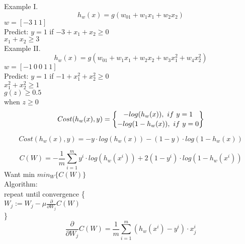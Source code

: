 \documentclass[12pt]{article}
\newcommand\tab[1][1cm]{\hspace*{#1}}
\newcommand*{\bfrac}[2]{\genfrac{\lbrace}{\rbrace}{0pt}{}{#1}{#2}}
\begin{document}
Example I.
\begin{equation}
h_w(x)=g(w_01+w_1x_1+w_2x_2)
\end{equation}
$w=[-3\ 1\ 1]$\\
Predict: $y=1$ if $-3+x_1+x_2\geq0$\\
$x_1+x_2\geq3$\\

\newpage
Example II.
\begin{equation}
h_w(x)=g(w_01+w_1x_1+w_2x_2+w_3x_1^2+w_4x_2^2)
\end{equation}
$w=[-1\ 0\ 0\ 1\ 1]$\\
Predict: $y=1$ if $-1+x_1^2+x_2^2\geq0$\\
$x_1^2+x_2^2\geq1$\\

{\color{red}
\hspace*{0.5cm}$g(z)\geq0.5$\\
\tab when $z\geq0$\\}
\begin{equation}
Cost(h_w(x), y)=\bfrac{-log(h_w(x)),\ if\ y=1}{-log(1-h_w(x)),\ if\ y=0}
\end{equation}

\begin{equation}
Cost(h_w(x), y)=-y\cdot log(h_w(x))-(1-y)\cdot log(1-h_w(x))
\end{equation}

\begin{equation}
C(W)=-\frac{1}{m}\sum_{i=1}^{m}y^{i}\cdot log(h_w(x^{i}))+2(1-y^{i})\cdot log(1-h_w(x^{i}))
\end{equation}
Want min $min_W\{C(W)\}$\\
Algorithm:\\
\tab repeat until convergence \{\\
\tab \tab $W_j:=W_j-\mu\frac{\partial}{\partial W_j}C(W)$\\
\tab \}\\

\begin{equation}
\frac{\partial}{\partial W_j}C(W)=\frac{1}{m}\sum_{i=1}^{m}(h_w(x^i)-y^i)\cdot x_j^i
\end{equation}

\newpage
\end{document}
